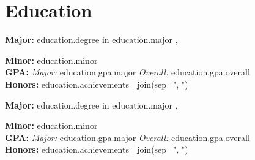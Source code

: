 \documentclass[10pt]{resume}
\begin{document}

{%
\vspace{0.5em}
{%
{%

\section{Education}

{%
{%
{%
{%
{%
\textbf{Major:} {{ education.degree }} in {{ education.major }}, {%
\textbf{Minor:} {{ education.minor }}\\
\textbf{GPA:} \textit{Major:} {{ education.gpa.major }} \textit{Overall:} {{education.gpa.overall}}\\
\textbf{Honors:} {{ education.achievements | join(sep=", ") }}
{%

{%
{%
{%
{%
{%
\textbf{Major:} {{ education.degree }} in {{ education.major }}, {%
\textbf{Minor:} {{ education.minor }}\\
\textbf{GPA:} \textit{Major:} {{ education.gpa.major }} \textit{Overall:} {{education.gpa.overall}}\\
\textbf{Honors:} {{ education.achievements | join(sep=", ") }}
{%

}}}}}}}}}}}}}}}}}
\end{document}
